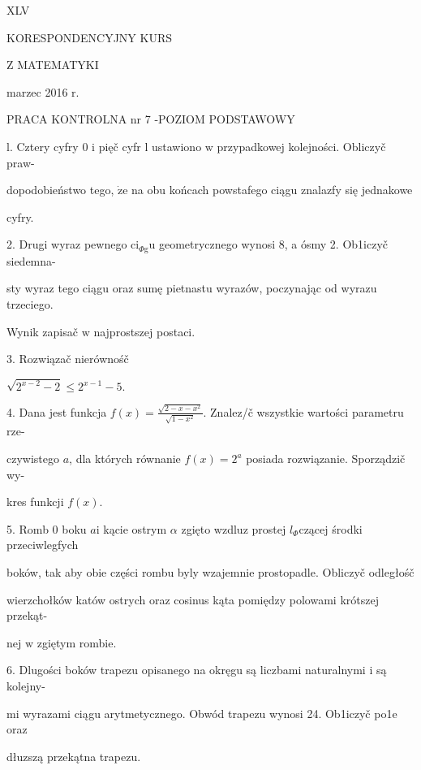 \documentclass[a4paper,12pt]{article}
\begin{document}
XLV

KORESPONDENCYJNY KURS

Z MATEMATYKI

marzec 2016 r.

PRACA KONTROLNA nr 7 -POZIOM PODSTAWOWY

l. Cztery cyfry 0 $\mathrm{i}$ pięč cyfr l ustawiono $\mathrm{w}$ przypadkowej kolejności. Obliczyč praw-

dopodobieństwo tego, $\dot{\mathrm{z}}\mathrm{e}$ na obu końcach powstafego ciągu znalazfy się jednakowe

cyfry.

2. Drugi wyraz pewnego $\mathrm{c}\mathrm{i}_{\Phi \mathrm{g}}\mathrm{u}$ geometrycznego wynosi 8, a ósmy 2. Ob1iczyč siedemna-

sty wyraz tego ciągu oraz sumę pietnastu wyrazów, poczynając od wyrazu trzeciego.

Wynik zapisač $\mathrm{w}$ najprostszej postaci.

3. Rozwiązač nierównośč

$\sqrt{2^{x-2}-2}\leq 2^{x-1}-5.$

4. Dana jest funkcja $f(x)=\displaystyle \frac{\sqrt{2-x-x^{2}}}{\sqrt{1-x^{2}}}$. Znalez/č wszystkie wartości parametru rze-

czywistego $a$, dla których równanie $f(x)=2^{a}$ posiada rozwiązanie. Sporządzič wy-

kres funkcji $f(x).$

5. Romb $0$ boku $a\mathrm{i}$ kącie ostrym $\alpha$ zgięto wzdluz prostej $l_{\Phi}$czącej środki przeciwlegfych

boków, tak aby obie części rombu byly wzajemnie prostopadle. Obliczyč odległośč

wierzchołków katów ostrych oraz cosinus kąta pomiędzy polowami krótszej przekąt-

nej $\mathrm{w}$ zgiętym rombie.

6. Dlugości boków trapezu opisanego na okręgu są liczbami naturalnymi $\mathrm{i}$ są kolejny-

mi wyrazami ciągu arytmetycznego. Obwód trapezu wynosi 24. Ob1iczyč po1e oraz

dłuzszą przekątna trapezu.
\end{document}
